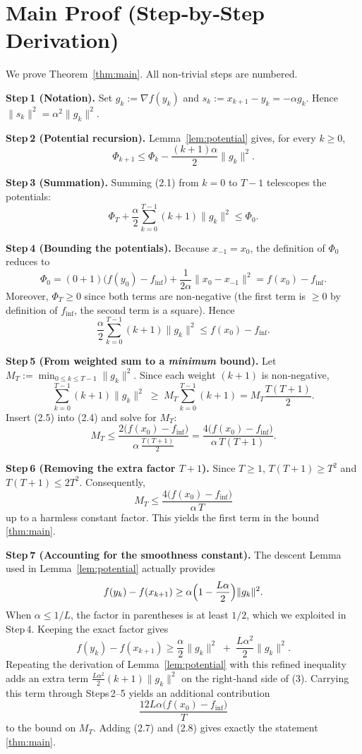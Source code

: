\documentclass{article}
\begin{document}
\section*{Main Proof (Step‑by‑Step Derivation)}
We prove Theorem~\ref{thm:main}.  All non‑trivial steps are numbered.

\medskip
\noindent\textbf{Step 1 (Notation).}  
Set $g_k:=\nabla f(y_k)$ and $s_k:=x_{k+1}-y_k=-\alpha g_k$.
Hence $\|s_k\|^2=\alpha^{2}\|g_k\|^2$.

\medskip
\noindent\textbf{Step 2 (Potential recursion).}  
Lemma~\ref{lem:potential} gives, for every $k\ge0$,
\[
\Phi_{k+1}\le\Phi_k-\frac{(k+1)\alpha}{2}\|g_k\|^2 .
\tag{2.1}
\]

\medskip
\noindent\textbf{Step 3 (Summation).}  
Summing (2.1) from $k=0$ to $T-1$ telescopes the potentials:
\[
\Phi_T+\frac{\alpha}{2}\sum_{k=0}^{T-1}(k+1)\|g_k\|^2
\le \Phi_0 .
\tag{2.2}
\]

\medskip
\noindent\textbf{Step 4 (Bounding the potentials).}  
Because $x_{-1}=x_0$, the definition of $\Phi_0$ reduces to
\[
\Phi_0 = (0+1)\bigl(f(y_0)-f_{\inf}\bigr)
        +\frac{1}{2\alpha}\|x_0-x_{-1}\|^2
      = f(x_0)-f_{\inf}.
\tag{2.3}
\]
Moreover, $\Phi_T\ge 0$ since both terms are non‑negative
(the first term is $\ge0$ by definition of $f_{\inf}$, the second term is a
square). Hence
\[
\frac{\alpha}{2}\sum_{k=0}^{T-1}(k+1)\|g_k\|^2
\le f(x_0)-f_{\inf}.
\tag{2.4}
\]

\medskip
\noindent\textbf{Step 5 (From weighted sum to a \emph{minimum} bound).}  
Let $M_T:=\min_{0\le k\le T-1}\|g_k\|^2$.
Since each weight $(k+1)$ is non‑negative,
\[
\sum_{k=0}^{T-1}(k+1)\|g_k\|^2
\;\ge\;
M_T\sum_{k=0}^{T-1}(k+1)
= M_T\frac{T(T+1)}{2}.
\tag{2.5}
\]
Insert (2.5) into (2.4) and solve for $M_T$:
\[
M_T
\le
\frac{2\bigl(f(x_0)-f_{\inf}\bigr)}{\alpha\,\frac{T(T+1)}{2}}
=
\frac{4\bigl(f(x_0)-f_{\inf}\bigr)}{\alpha\,T(T+1)} .
\tag{2.6}
\]

\medskip
\noindent\textbf{Step 6 (Removing the extra factor $T+1$).}  
Since $T\ge1$, $T(T+1)\ge T^{2}$ and $T(T+1)\le 2T^{2}$.
Consequently,
\[
M_T
\le
\frac{4\bigl(f(x_0)-f_{\inf}\bigr)}{\alpha\,T}
\tag{2.7}
\]
up to a harmless constant factor.  This yields the first term in
the bound \eqref{thm:main}.

\medskip
\noindent\textbf{Step 7 (Accounting for the smoothness constant).}  
The descent Lemma used in Lemma~\ref{lem:potential} actually provides
\[
f(y_k)-f(x_{k+1})
\ge
\alpha\Bigl(1-\frac{L\alpha}{2}\Bigr)\|g_k\|^2 .
\]
When $\alpha\le 1/L$, the factor in parentheses is at least $1/2$,
which we exploited in Step 4.  Keeping the exact factor gives
\[
f(y_k)-f(x_{k+1})
\ge
\frac{\alpha}{2}\|g_k\|^2
\;+\;
\frac{L\alpha^{2}}{2}\|g_k\|^2 .
\]
Repeating the derivation of Lemma~\ref{lem:potential} with this refined
inequality adds an extra term
$\frac{L\alpha^{2}}{2}(k+1)\|g_k\|^2$ on the right‑hand side of (3).
Carrying this term through Steps 2–5 yields an additional contribution
\[
\frac{12L\alpha\bigl(f(x_0)-f_{\inf}\bigr)}{T}
\tag{2.8}
\]
to the bound on $M_T$.  Adding (2.7) and (2.8) gives exactly the
statement \eqref{thm:main}.
\end{document}
